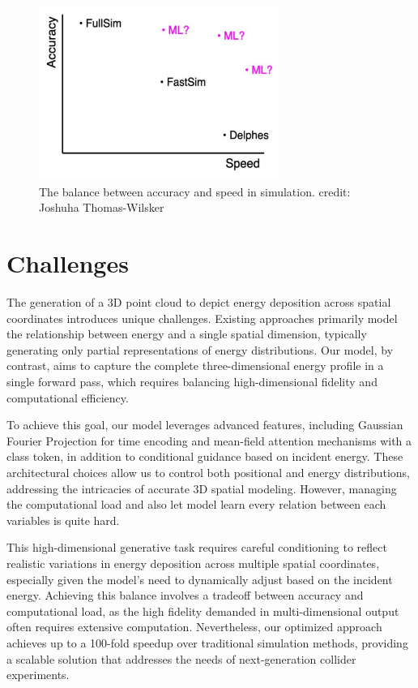 \begin{figure}[H]
    \centering
    \includegraphics[width=0.7\textwidth]{Figures/fast.png}
    \caption{The balance between accuracy and speed in simulation. credit: Joshuha Thomas-Wilsker}
    \label{fast}
\end{figure}

\section{Challenges}

The generation of a 3D point cloud to depict energy deposition across spatial coordinates introduces unique challenges. Existing approaches primarily model the relationship between energy and a single spatial dimension, typically generating only partial representations of energy distributions. Our model, by contrast, aims to capture the complete three-dimensional energy profile in a single forward pass, which requires balancing high-dimensional fidelity and computational efficiency.

To achieve this goal, our model leverages advanced features, including Gaussian Fourier Projection for time encoding and mean-field attention mechanisms with a class token, in addition to conditional guidance based on incident energy. These architectural choices allow us to control both positional and energy distributions, addressing the intricacies of accurate 3D spatial modeling. However, managing the computational load and also let model learn every relation between each variables is quite hard.

This high-dimensional generative task requires careful conditioning to reflect realistic variations in energy deposition across multiple spatial coordinates, especially given the model’s need to dynamically adjust based on the incident energy. Achieving this balance involves a tradeoff between accuracy and computational load, as the high fidelity demanded in multi-dimensional output often requires extensive computation. Nevertheless, our optimized approach achieves up to a 100-fold speedup over traditional simulation methods, providing a scalable solution that addresses the needs of next-generation collider experiments.

